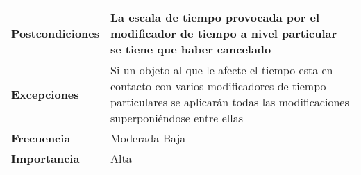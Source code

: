 \begin{tabularx}{\columnwidth}{l|l}
\begin{minipage}{0.25\columnwidth}
\textbf{Postcondiciones} 
\end{minipage}
&
\begin{minipage}{0.65\columnwidth}
La escala de tiempo provocada por el modificador de tiempo a nivel particular se tiene que haber cancelado
\end{minipage}
\\ \hline

\begin{minipage}{0.25\columnwidth}
\textbf{Excepciones} 
\end{minipage}
&
\begin{minipage}{0.65\columnwidth}
Si un objeto al que le afecte el tiempo esta en contacto con varios modificadores de tiempo particulares se aplicarán todas las modificaciones superponiéndose entre ellas 
\end{minipage}
\\ \hline

\begin{minipage}{0.25\columnwidth}
\textbf{Frecuencia} 
\end{minipage}
&
\begin{minipage}{0.65\columnwidth}
Moderada-Baja
\end{minipage}
\\ \hline

\begin{minipage}{0.25\columnwidth}
\textbf{Importancia} 
\end{minipage}
&
\begin{minipage}{0.65\columnwidth}
Alta
\end{minipage}
\\ \hline
\end{tabularx}

